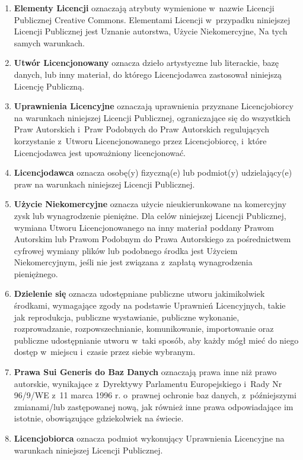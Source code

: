 \documentclass[oneside,polish,11pt,rmheadings]{mwbk}
\begin{document}
\begin{enumerate}
\item  \textbf{{\textmd{Elementy Licencji}}}{ oznaczają atrybuty wymienione w~nazwie Licencji Publicznej Creative Commons. Elementami Licencji w~przypadku niniejszej Licencji Publicznej jest Uznanie autorstwa, Użycie Niekomercyjne, Na tych samych warunkach. }
 \item  \textbf{{\textmd{Utwór Licencjonowany}}}{ oznacza dzieło artystyczne lub literackie, bazę danych, lub inny materiał, do którego Licencjodawca zastosował niniejszą Licencję Publiczną. } 
 \item  \textbf{{\textmd{Uprawnienia Licencyjne}}}{ oznaczają uprawnienia przyznane Licencjobiorcy na warunkach niniejszej Licencji Publicznej, ograniczające się do wszystkich Praw Autorskich i~Praw Podobnych do Praw Autorskich regulujących korzystanie z~Utworu Licencjonowanego przez Licencjobiorcę, i~które Licencjodawca jest upoważniony licencjonować. } 
 \item  \textbf{{\textmd{Licencjodawca}}}{ oznacza osobę(y) fizyczną(e) lub podmiot(y) udzielający(e) praw na warunkach niniejszej Licencji Publicznej. } 
 \item  \textbf{{\textmd{Użycie Niekomercyjne}}}{ oznacza użycie nieukierunkowane na komercyjny zysk lub wynagrodzenie pieniężne. Dla celów niniejszej Licencji Publicznej, wymiana Utworu Licencjonowanego na inny materiał poddany Prawom Autorskim lub Prawom Podobnym do Prawa Autorskiego za pośrednictwem cyfrowej wymiany plików lub podobnego środka jest Użyciem Niekomercyjnym, jeśli nie jest związana z~zapłatą wynagrodzenia pieniężnego. } 
 \item  \textbf{{\textmd{Dzielenie się}}}{ oznacza udostępniane publiczne utworu jakimikolwiek środkami, wymagające zgody na podstawie Uprawnień Licencyjnych, takie jak reprodukcja, publiczne wystawianie, publiczne wykonanie, rozprowadzanie, rozpowszechnianie, komunikowanie, importowanie oraz publiczne udostępnianie utworu w~taki sposób, aby każdy mógł mieć do niego dostęp w~miejscu i~czasie przez siebie wybranym. } 
 \item  \textbf{{\textmd{Prawa Sui Generis do Baz Danych}}}{ oznaczają prawa inne niż prawo autorskie, wynikające z~Dyrektywy Parlamentu Europejskiego i~Rady Nr 96/9/WE z~11 marca 1996 r. o~prawnej ochronie baz danych, z~późniejszymi zmianami/lub zastępowanej nową, jak również inne prawa odpowiadające im istotnie, obowiązujące gdziekolwiek na świecie. }
  \item  \textbf{{\textmd{Licencjobiorca}}}{ oznacza podmiot wykonujący Uprawnienia Licencyjne na warunkach niniejszej Licencji Publicznej. } \end{enumerate}
\end{document}
